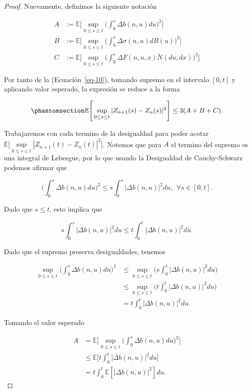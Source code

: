 \documentclass[
  spanish,
  us-letterpaper,
]{scrreprt}
\theoremstyle{plain}
\theoremstyle{plain}
\theoremstyle{definition}
\theoremstyle{plain}
\theoremstyle{remark}
\begin{document}
\begin{proof}
Nuevamente, definimos la siguiente notación

\[
    \begin{aligned}
        A & := \mathbb{E}\Bigg[\sup\limits_{0\leq s\leq t}\Bigg(\int_0^s \Delta b(n,u)du\Bigg)^2\Bigg]\\ 
        B & := \mathbb{E}\Bigg[\sup\limits_{0\leq s\leq t}\Bigg(\int_0^s \Delta \sigma(n,u)dB(u)\Bigg)^2\Bigg]\\ 
        C & := \mathbb{E}\Bigg[\sup\limits_{0\leq s\leq t}\Bigg(\int_0^s \Delta F(n,u,x)\widetilde{N}(du,dx)\Bigg)^2\Bigg]
    \end{aligned}
\]

Por tanto de la (Ecuación~\ref{eq-10}), tomando supremo en el intervalo
\([0,t]\) y aplicando valor esperado, la expresión se reduce a la forma

\begin{equation}\phantomsection\label{eq-11}{
    \mathbb{E}\Bigg[\sup\limits_{0\leq s\leq t} |Z_{n+1}(s)-Z_n(s)|^2\Bigg]\leq 3(A+B+C).
}\end{equation}

Trabajaremos con cada termino de la desigualdad para poder acotar
\(\displaystyle \mathbb{E}\Bigg[\sup\limits_{0\leq s\leq t} |Z_{n+1}(t)-Z_n(t)|^2\Bigg]\).
Notemos que para \(A\) el termino del supremo es una integral de
Lebesgue, por lo que usando la Desigualdad de Cauchy-Schwarz podemos
afirmar que

\[  
    \Bigg(\int_0^s \Delta b(n,u)du\Bigg)^2\leq s \int_0^s |\Delta b(n,u)|^2du,\ \ \forall s\in [0,t].
\]

Dado que \(s\leq t\), esto implica que

\[
    s \int_0^s |\Delta b(n,u)|^2du\leq t\int_0^t |\Delta b(n,u)|^2du.
\]

Dado que el supremo preserva desigualdades, tenemos

\[
    \begin{aligned}
            \sup\limits_{0\leq s\leq t} \Bigg(\int_0^s \Delta b(n,u)du\Bigg)^2 & \leq \sup\limits_{0\leq s\leq t}\Bigg(s \int_0^s |\Delta b(n,u)|^2du\Bigg)\\ 
            & \leq \sup\limits_{0\leq s\leq t}\Bigg(t\int_0^t |\Delta b(n,u)|^2du\Bigg)\\ 
            & = t\int_0^t |\Delta b(n,u)|^2du.
    \end{aligned}
\]

Tomando el valor esperado

\[
    \begin{aligned}
        A & = \mathbb{E}\Bigg[\sup\limits_{0\leq s\leq t}\Bigg(\int_0^s \Delta b(n,u)du\Bigg)^2\Bigg]\\ 
        & \leq \mathbb{E}\Bigg[t\int_0^t |\Delta b(n,u)|^2du\Bigg]\\ 
        & = t\int_0^t \mathbb{E}[|\Delta b(n,u)|^2]du.
    \end{aligned}
\]


\end{proof}
\end{document}
